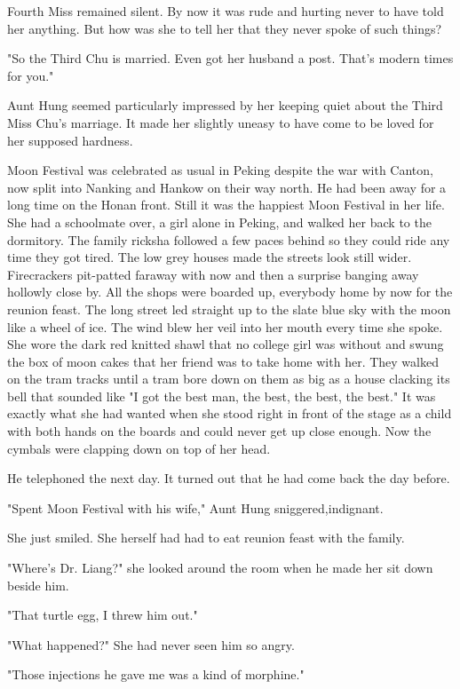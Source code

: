 \par Fourth Miss remained silent. By now it was rude and hurting never to have told her anything. But how was she to tell her that they never spoke of such things?
\par "So the Third Chu is married. Even got her husband a post. That's modern times for you."
\par Aunt Hung seemed particularly impressed by her keeping quiet about the Third Miss Chu's marriage. It made her slightly uneasy to have come to be loved for her supposed hardness.
\par Moon Festival was celebrated as usual in Peking despite the war with Canton, now split into Nanking and Hankow on their way north. He had been away for a long time on the Honan front. Still it was the happiest Moon Festival in her life. She had a schoolmate over, a girl alone in Peking, and walked her back to the dormitory. The family ricksha followed a few paces behind so they could ride any time they got tired. The low grey houses made the streets look still wider. Firecrackers pit-patted faraway with now and then a surprise banging away hollowly close by. All the shops were boarded up, everybody home by now for the reunion feast. The long street led straight up to the slate blue sky with the moon like a wheel of ice. The wind blew her veil into her mouth every time she spoke. She wore the dark red knitted shawl that no college girl was without and swung the box of moon cakes that her friend was to take home with her. They walked on the tram tracks until a tram bore down on them as big as a house clacking its bell that sounded like "I got the best man, the best, the best, the best." It was exactly what she had wanted when she stood right in front of the stage as a child with both hands on the boards and could never get up close enough. Now the cymbals were clapping down on top of her head.
\par He telephoned the next day. It turned out that he had come back the day before.
\par "Spent Moon Festival with his wife," Aunt Hung sniggered,indignant.
\par She just smiled. She herself had had to eat reunion feast with the family.
\par "Where's Dr. Liang?" she looked around the room when he made her sit down beside him.
\par "That turtle egg, I threw him out."
\par "What happened?" She had never seen him so angry.
\par "Those injections he gave me was a kind of morphine."
